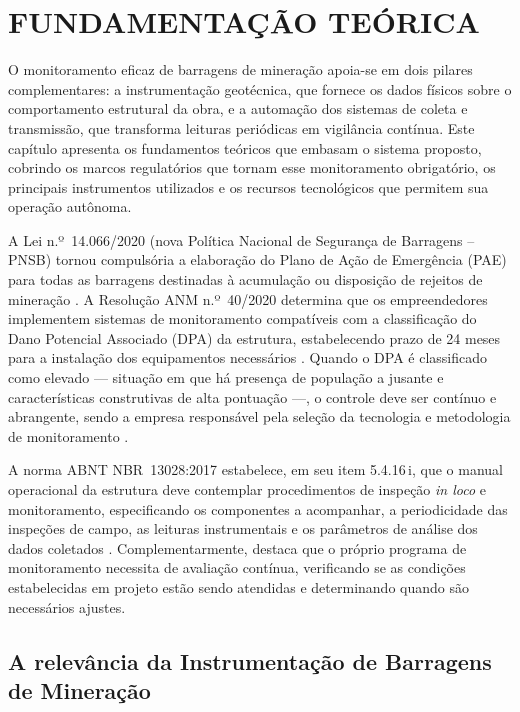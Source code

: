 \chapter{FUNDAMENTAÇÃO TEÓRICA}
\label{cap2Fundamentacao}

O monitoramento eficaz de barragens de mineração apoia-se em dois pilares
complementares: a instrumentação geotécnica, que fornece os dados físicos sobre
o comportamento estrutural da obra, e a automação dos sistemas de coleta e
transmissão, que transforma leituras periódicas em vigilância contínua. Este
capítulo apresenta os fundamentos teóricos que embasam o sistema proposto,
cobrindo os marcos regulatórios que tornam esse monitoramento obrigatório, os
principais instrumentos utilizados e os recursos tecnológicos que permitem sua
operação autônoma.

A Lei n.º~14.066/2020 (nova Política Nacional de Segurança de Barragens --
PNSB) tornou compulsória a elaboração do Plano de Ação de Emergência (PAE)
para todas as barragens destinadas à acumulação ou disposição de rejeitos de
mineração \cite{brasil2020lei14066}. A Resolução ANM n.º~40/2020 determina
que os empreendedores implementem sistemas de monitoramento compatíveis com
a classificação do Dano Potencial Associado (DPA) da estrutura, estabelecendo
prazo de 24 meses para a instalação dos equipamentos necessários
\cite{anm2021resolucao56}. Quando o DPA é classificado como elevado --- situação
em que há presença de população a jusante e características construtivas de alta
pontuação ---, o controle deve ser contínuo e abrangente, sendo a empresa
responsável pela seleção da tecnologia e metodologia de monitoramento
\cite{silva2019sistema}.

A norma ABNT NBR~13028:2017 estabelece, em seu item 5.4.16\,i, que o manual
operacional da estrutura deve contemplar procedimentos de inspeção \textit{in
loco} e monitoramento, especificando os componentes a acompanhar, a
periodicidade das inspeções de campo, as leituras instrumentais e os parâmetros
de análise dos dados coletados \cite{abnt2017}. Complementarmente,
 destaca que o próprio programa de monitoramento necessita
de avaliação contínua, verificando se as condições estabelecidas em projeto estão
sendo atendidas e determinando quando são necessários ajustes.

\section{A relevância da Instrumentação de Barragens de Mineração}
\label{sec:relevancia_instrumentacao}

